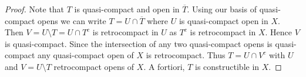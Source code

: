 \documentclass[10pt,a4paper]{amsart}
\theoremstyle{plain}
\theoremstyle{definition}
\theoremstyle{remark}
\numberwithin{equation}{subsection}
\begin{document}
\begin{proof}
Note that $T$ is quasi-compact and open in $\overline{T}$.
Using our basis of quasi-compact opens we can write
$T = U \cap \overline{T}$ where $U$ is quasi-compact open in $X$.
Then $V = U \setminus T = U \cap T^c$ is retrocompact in $U$ as $T^c$
is retrocompact in $X$. Hence $V$ is quasi-compact. Since
the intersection of any two quasi-compact opens is quasi-compact
any quasi-compact open of $X$ is retrocompact. Thus $T = U \cap V^c$
with $U$ and $V = U \setminus T$ retrocompact opens of $X$.
A fortiori, $T$ is constructible in $X$.
\end{proof}
\end{document}
